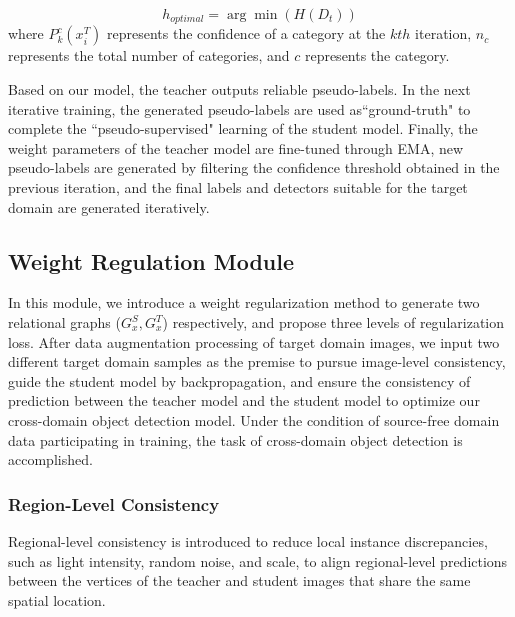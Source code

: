 \documentclass[sn-mathphys]{sn-jnl}%
\theoremstyle{thmstyleone}%
\theoremstyle{thmstyletwo}%
\theoremstyle{thmstylethree}%
\begin{document}
\begin{equation}
{{h}_{optimal}}=\arg \min (H({{D}_{t}}))
\label{eq:04}
\end{equation}
where $P_{k}^{c}(x_{i}^{T})$ represents the confidence of a category at the $kth$ iteration, ${{n}_{c}}$ represents the total number of categories, and $c$ represents the category.

Based on our model, the teacher outputs reliable pseudo-labels. In the next iterative training, the generated pseudo-labels are used as``ground-truth" to complete the ``pseudo-supervised" learning of the student model. Finally, the weight parameters of the teacher model are fine-tuned through EMA, new pseudo-labels are generated by filtering the confidence threshold obtained in the previous iteration, and the final labels and detectors suitable for the target domain are generated iteratively.

%
%
\subsection{Weight Regulation Module}\label{sec:sec3.3}

In this module, we introduce a weight regularization method to generate two relational graphs ($G_{x}^{S},G_{x}^{T}$) respectively, and propose three levels of regularization loss. After data augmentation processing of target domain images, we input two different target domain samples as the premise to pursue image-level consistency, guide the student model by backpropagation, and ensure the consistency of prediction between the teacher model and the student model to optimize our cross-domain object detection model. Under the condition of source-free domain data participating in training, the task of cross-domain object detection is accomplished.

%
%
\subsubsection{Region-Level Consistency}

Regional-level consistency is introduced to reduce local instance discrepancies, such as light intensity, random noise, and scale, to align regional-level predictions between the vertices of the teacher and student images that share the same spatial location.
\end{document}
